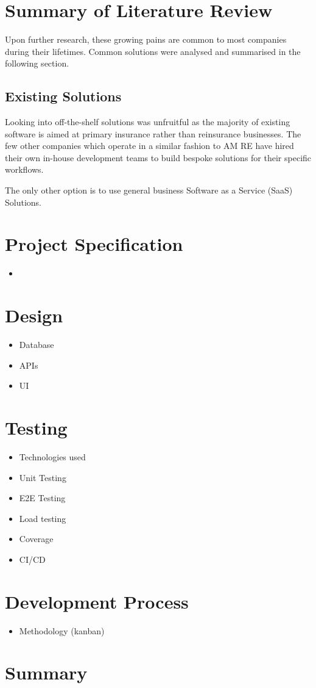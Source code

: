 \documentclass[12pt]{article}
\begin{document}
\section{Summary of Literature Review}

Upon further research, these growing pains are common to most companies during their lifetimes. Common solutions were analysed and summarised in the following section.

\subsection{Existing Solutions}

Looking into off-the-shelf solutions was unfruitful as the majority of existing software is aimed at primary insurance rather than reinsurance businesses. The few other companies which operate in a similar fashion to AM RE have hired their own in-house development teams to build bespoke solutions for their specific workflows.

The only other option is to use general business Software as a Service (SaaS) Solutions.

\section{Project Specification}
\begin{itemize}
    \item
\end{itemize}
\section{Design}
\begin{itemize}
    \item Database
    \item APIs
    \item UI
\end{itemize}
\section{Testing}
\begin{itemize}
    \item Technologies used
    \item Unit Testing
    \item E2E Testing
    \item Load testing
    \item Coverage
    \item CI/CD
\end{itemize}
\section{Development Process}
\begin{itemize}
    \item Methodology (kanban)
\end{itemize}
\section{Summary}



\end{document}
